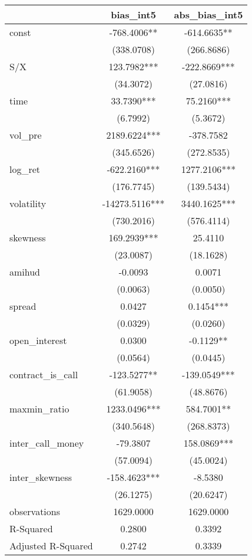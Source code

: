 \begin{tabular}{lcc}
\hline
                   &   bias\_int5   & abs\_bias\_int5  \\
\midrule
\midrule
const              & -768.4006**    & -614.6635**      \\
                   & (338.0708)     & (266.8686)       \\
S/X                & 123.7982***    & -222.8669***     \\
                   & (34.3072)      & (27.0816)        \\
time               & 33.7390***     & 75.2160***       \\
                   & (6.7992)       & (5.3672)         \\
vol\_pre           & 2189.6224***   & -378.7582        \\
                   & (345.6526)     & (272.8535)       \\
log\_ret           & -622.2160***   & 1277.2106***     \\
                   & (176.7745)     & (139.5434)       \\
volatility         & -14273.5116*** & 3440.1625***     \\
                   & (730.2016)     & (576.4114)       \\
skewness           & 169.2939***    & 25.4110          \\
                   & (23.0087)      & (18.1628)        \\
amihud             & -0.0093        & 0.0071           \\
                   & (0.0063)       & (0.0050)         \\
spread             & 0.0427         & 0.1454***        \\
                   & (0.0329)       & (0.0260)         \\
open\_interest     & 0.0300         & -0.1129**        \\
                   & (0.0564)       & (0.0445)         \\
contract\_is\_call & -123.5277**    & -139.0549***     \\
                   & (61.9058)      & (48.8676)        \\
maxmin\_ratio      & 1233.0496***   & 584.7001**       \\
                   & (340.5648)     & (268.8373)       \\
inter\_call\_money & -79.3807       & 158.0869***      \\
                   & (57.0094)      & (45.0024)        \\
inter\_skewness    & -158.4623***   & -8.5380          \\
                   & (26.1275)      & (20.6247)        \\
observations       & 1629.0000      & 1629.0000        \\
R-Squared          & 0.2800         & 0.3392           \\
Adjusted R-Squared & 0.2742         & 0.3339           \\
\hline
\end{tabular}